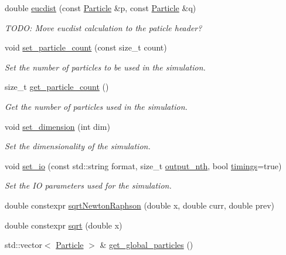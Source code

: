 \begin{DoxyCompactItemize}
double \mbox{\hyperlink{namespacewash_aecf1c6d565098a830dfeb491a4638093}{eucdist}} (const \mbox{\hyperlink{classwash_1_1Particle}{Particle}} \&p, const \mbox{\hyperlink{classwash_1_1Particle}{Particle}} \&q)
\begin{DoxyCompactList}\small\item\em T\+O\+DO\+: Move eucdist calculation to the paticle header? \end{DoxyCompactList}\item 
void \mbox{\hyperlink{namespacewash_a20a6940ce5a881482fe472ed704f177e}{set\+\_\+particle\+\_\+count}} (const size\+\_\+t count)
\begin{DoxyCompactList}\small\item\em Set the number of particles to be used in the simulation. \end{DoxyCompactList}\item 
size\+\_\+t \mbox{\hyperlink{namespacewash_a3b281fefe2419e7bc1450029b0324ab8}{get\+\_\+particle\+\_\+count}} ()
\begin{DoxyCompactList}\small\item\em Get the number of particles used in the simulation. \end{DoxyCompactList}\item 
void \mbox{\hyperlink{namespacewash_a6b9608d3d8934431c9ab6af488992f10}{set\+\_\+dimension}} (int dim)
\begin{DoxyCompactList}\small\item\em Set the dimensionality of the simulation. \end{DoxyCompactList}\item 
void \mbox{\hyperlink{namespacewash_aaa75af8f4a35ef4b222eace2714ee9f8}{set\+\_\+io}} (const std\+::string format, size\+\_\+t \mbox{\hyperlink{namespacewash_a7b6eb3e63a02fcbd9fafd59e34fbd320}{output\+\_\+nth}}, bool \mbox{\hyperlink{namespacewash_a40aed5edcd0e0403841e3f83eaa41965}{timings}}=true)
\begin{DoxyCompactList}\small\item\em Set the IO parameters used for the simulation. \end{DoxyCompactList}\item 
double constexpr \mbox{\hyperlink{namespacewash_a344dd90c7f5c2e7fb6ba80fc25d71bf2}{sqrt\+Newton\+Raphson}} (double x, double curr, double prev)
\item 
double constexpr \mbox{\hyperlink{namespacewash_aa7c01695ae3be583edc0ed8c4bd756f5}{sqrt}} (double x)
\item 
std\+::vector$<$ \mbox{\hyperlink{classwash_1_1Particle}{Particle}} $>$ \& \mbox{\hyperlink{namespacewash_a95f49b3110d612f44f7b88a0da43f154}{get\+\_\+global\+\_\+particles}} ()

\end{DoxyCompactItemize}
